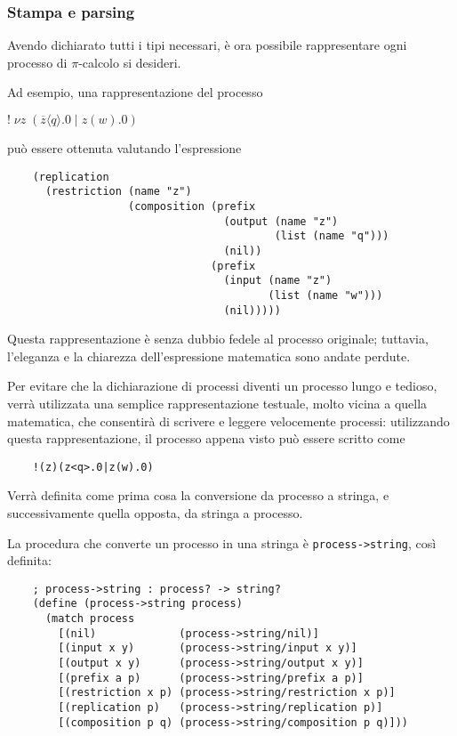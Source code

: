 \subsubsection{Stampa e parsing}

Avendo dichiarato tutti i tipi necessari, \`e ora possibile rappresentare
ogni processo di $\pi$-calcolo si desideri.

Ad esempio, una rappresentazione del processo

\begin{pilisting}
$
    ! \; \nu z \; (
      \overline{z}\langle q\rangle.0 \; | \;
      z(w).0
    )
$
\end{pilisting}

pu\`o essere ottenuta valutando l'espressione

\begin{lstlisting}
    (replication
      (restriction (name "z")
                   (composition (prefix
                                  (output (name "z")
                                          (list (name "q")))
                                  (nil))
                                (prefix
                                  (input (name "z")
                                         (list (name "w")))
                                  (nil)))))
\end{lstlisting}

Questa rappresentazione \`e senza dubbio fedele al processo originale;
tuttavia, l'eleganza e la chiarezza dell'espressione matematica sono
andate perdute.

Per evitare che la dichiarazione di processi diventi un processo lungo
e tedioso, verr\`a utilizzata una semplice rappresentazione testuale,
molto vicina a quella matematica, che consentir\`a di scrivere e leggere
velocemente processi: utilizzando questa rappresentazione, il processo
appena visto pu\`o essere scritto come

\begin{lstlisting}
    !(z)(z<q>.0|z(w).0)
\end{lstlisting}

Verr\`a definita come prima cosa la conversione da processo a stringa,
e successivamente quella opposta, da stringa a processo.

La procedura che converte un processo in una stringa \`e
\lstinline{process->string}, cos\`i definita:

\begin{lstlisting}
    ; process->string : process? -> string?
    (define (process->string process)
      (match process
        [(nil)             (process->string/nil)]
        [(input x y)       (process->string/input x y)]
        [(output x y)      (process->string/output x y)]
        [(prefix a p)      (process->string/prefix a p)]
        [(restriction x p) (process->string/restriction x p)]
        [(replication p)   (process->string/replication p)]
        [(composition p q) (process->string/composition p q)]))
\end{lstlisting}

